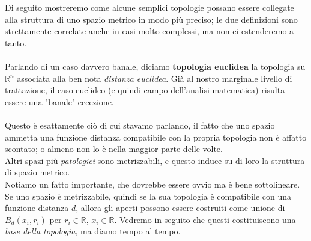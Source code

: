Di seguito mostreremo come alcune semplici topologie possano essere collegate alla struttura di uno spazio metrico in modo più preciso; le due definizioni sono strettamente correlate anche in casi molto complessi, ma non ci estenderemo a tanto. \\ \\
Parlando di un caso davvero banale, diciamo \textbf{topologia euclidea} la topologia su $\mathbb{R}^n$ associata alla ben nota \textit{distanza euclidea}. Già al nostro marginale livello di trattazione, il caso euclideo (e quindi campo dell'analisi matematica) risulta essere una "banale" eccezione.
\\ \\ Questo è esattamente ciò di cui stavamo parlando, il fatto che uno spazio ammetta una funzione distanza compatibile con la propria topologia non è affatto scontato; o almeno non lo è nella maggior parte delle volte. \\ Altri spazi più \textit{patologici} sono metrizzabili, e questo induce su di loro la struttura di spazio metrico. \\ Notiamo un fatto importante, che dovrebbe essere ovvio ma è bene sottolineare. Se uno spazio è metrizzabile, quindi se la sua topologia è compatibile con una funzione distanza $d$, allora gli aperti possono essere costruiti come unione di $B_d(x_i,r_i)$ per $r_i \in \mathbb{R}$, $x_i \in \mathbb{R}$. Vedremo in seguito che questi costituiscono una \textit{base della topologia}, ma diamo tempo al tempo.
